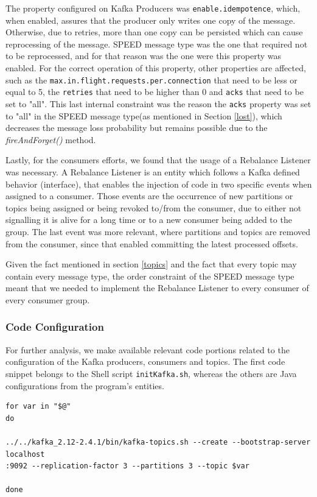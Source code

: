 \documentclass[12pt]{article}
\begin{document}
The property configured on Kafka Producers was \texttt{enable.idempotence}, which, when enabled, assures that the producer only writes one copy of the message. 
Otherwise, due to retries, more than one copy can be persisted which can cause reprocessing of the message. 
SPEED message type was the one that required not to be reprocessed, and for that reason was the one were this property was enabled. 
For the correct operation of this property, other properties are affected, such as the \texttt{max.in.flight.requests.per.connection} that need to be less or 
equal to 5, the \texttt{retries} that need to be higher than 0 and \texttt{acks} that need to be set to "all". 
This last internal constraint was the reason the \texttt{acks} property was set to "all" in the SPEED message type(as mentioned in Section \ref{lost}), which 
decreases the message loss probability but remains possible due to the \textit{fireAndForget()} method.

Lastly, for the consumers efforts, we found that the usage of a Rebalance Listener was necessary. 
A Rebalance Listener is an entity which follows a Kafka defined behavior (interface), that enables the injection of code in two specific events when assigned to a consumer. 
Those events are the occurrence of new partitions or topics being assigned or being revoked to/from the consumer, due to either not signalling it is alive for 
a long time or to a new consumer being added to the group. 
The last event was more relevant, where partitions and topics are removed from the consumer, since that enabled committing the latest processed offsets.

Given the fact mentioned in section \ref{topics} and the fact that every topic may contain every message type, the order constraint of the SPEED message type 
meant that we needed to implement the Rebalance Listener to every consumer of every consumer group.

\subsubsection{Code Configuration}

For further analysis, we make available relevant code portions related to the configuration of the Kafka producers, consumers and topics.
The first code snippet belongs to the Shell script \texttt{initKafka.sh}, whereas the others are Java configurations from the program's entities. 

\vspace{2pt}
\begingroup
\fontsize{9pt}{10pt}\selectfont
\begin{verbatim}
for var in "$@"
do

../../kafka_2.12-2.4.1/bin/kafka-topics.sh --create --bootstrap-server localhost
:9092 --replication-factor 3 --partitions 3 --topic $var

done
\end{verbatim}
\endgroup
\end{document}
